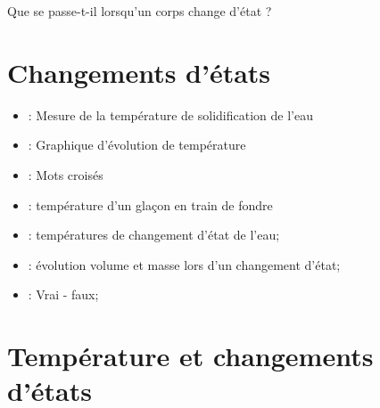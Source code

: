 \documentclass[12pt,a4paper]{article}
\date{}
\title{}
\begin{document}
	
\graphicspath{{./img/}}	



\begin{mypb}
	\begin{center}
		{\Large Que se passe-t-il lorsqu'un corps change d'état ?}
	\end{center}
\end{mypb}


\section{Changements d'états}







\begin{myexos}
	\begin{itemize}
		\item {} : Mesure de la température de solidification de l'eau
		\item {} : Graphique d'évolution de température
		\item {} : Mots croisés
		\item {} : température d'un glaçon en train de fondre
		\item {}  : températures de changement d'état de l'eau;
		\item {} : évolution volume et masse lors d'un changement d'état;
		\item {} : Vrai - faux;		
	\end{itemize}
\end{myexos}



\section{Température et changements d'états}



\end{document}
